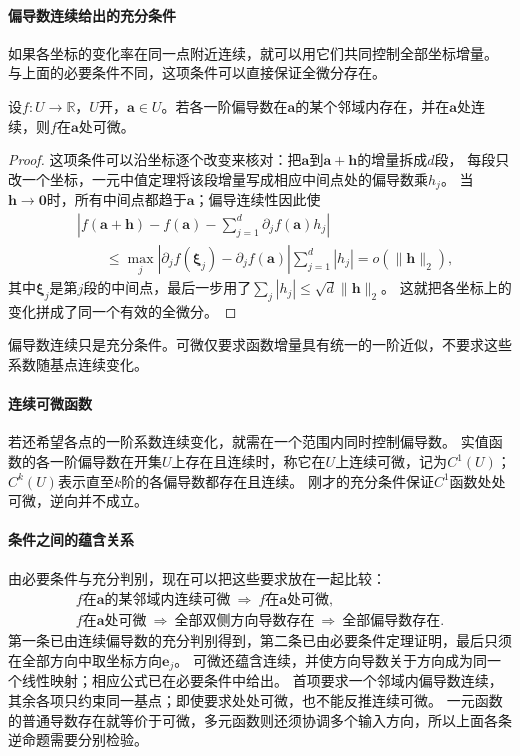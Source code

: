 \paragraph{偏导数连续给出的充分条件}
如果各坐标的变化率在同一点附近连续，就可以用它们共同控制全部坐标增量。
与上面的必要条件不同，这项条件可以直接保证全微分存在。
\begin{theorem}[偏导数连续与可微性]
\label{thm:multivariable-continuous-partials-sufficient}
设$f:U\to\mathbb R$，$U$开，$\bm a\in U$。若各一阶偏导数在$\bm a$的某个邻域内存在，并在$\bm a$处连续，则$f$在$\bm a$处可微。
\end{theorem}
\begin{proof}
这项条件可以沿坐标逐个改变来核对：把$\bm a$到$\bm a+\bm h$的增量拆成$d$段，
每段只改一个坐标，一元中值定理将该段增量写成相应中间点处的偏导数乘$h_j$。
当$\bm h\to\bm0$时，所有中间点都趋于$\bm a$；偏导连续性因此使
\[
 \begin{aligned}
 &\left|f(\bm a+\bm h)-f(\bm a)-\sum_{j=1}^d\partial_j f(\bm a)h_j\right|\\
 &\qquad\leq \max_j\left|\partial_j f(\bm\xi_j)-\partial_j f(\bm a)\right|
       \sum_{j=1}^d|h_j|
 =o(\lVert\bm h\rVert_2),
 \end{aligned}
\]
其中$\bm\xi_j$是第$j$段的中间点，最后一步用了$\sum_j|h_j|\leq\sqrt d\lVert\bm h\rVert_2$。
这就把各坐标上的变化拼成了同一个有效的全微分。
\end{proof}
偏导数连续只是充分条件。可微仅要求函数增量具有统一的一阶近似，不要求这些系数随基点连续变化。

\paragraph{连续可微函数}
若还希望各点的一阶系数连续变化，就需在一个范围内同时控制偏导数。
实值函数的各一阶偏导数在开集$U$上存在且连续时，称它在$U$上连续可微，记为$C^1(U)$；$C^k(U)$表示直至$k$阶的各偏导数都存在且连续。
刚才的充分条件保证$C^1$函数处处可微，逆向并不成立。

\paragraph{条件之间的蕴含关系}
由必要条件与充分判别，现在可以把这些要求放在一起比较：
\[
 \begin{gathered}
 f\text{在}\bm a\text{的某邻域内连续可微}
 \ \Longrightarrow\ f\text{在}\bm a\text{处可微},\\
 f\text{在}\bm a\text{处可微}
 \ \Longrightarrow\ \text{全部双侧方向导数存在}
 \ \Longrightarrow\ \text{全部偏导数存在}.
 \end{gathered}
\]
第一条已由连续偏导数的充分判别得到，第二条已由必要条件定理证明，最后只须在全部方向中取坐标方向$\bm e_j$。
可微还蕴含连续，并使方向导数关于方向成为同一个线性映射；相应公式已在必要条件中给出。
首项要求一个邻域内偏导数连续，其余各项只约束同一基点；即使要求处处可微，也不能反推连续可微。
一元函数的普通导数存在就等价于可微，多元函数则还须协调多个输入方向，所以上面各条逆命题需要分别检验。

